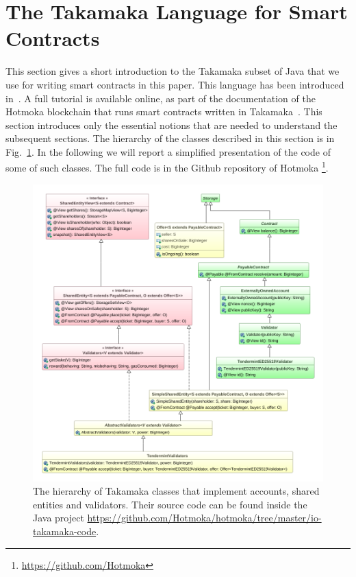 \section{The Takamaka Language for Smart Contracts}\label{sec:takamaka}

This section gives a short introduction to the Takamaka subset of
Java that we use for writing smart contracts in this paper.
This language has been introduced in~\cite{Spoto19}. A full tutorial
is available online, as part of the documentation of the Hotmoka
blockchain that runs smart contracts written
in Takamaka~\cite{hotmoka_repository}. This section introduces only
the essential notions that are needed to understand the subsequent sections.
The hierarchy of the classes described in this section is in Fig.~\ref{fig:hierarchy-entities}.
In the following we will report a simplified presentation of the code of some
of such classes. The full code is in the Github repository of Hotmoka \footnote{\url{https://github.com/Hotmoka}}.

\begin{figure}[t]
  \begin{center}
    \includegraphics[width=12.2cm]{entities-hierarchy.png}
  \end{center}
  \caption{The hierarchy of Takamaka classes that implement accounts, shared entities and validators. Their source code can be found inside the Java project \textsf{\url{https://github.com/Hotmoka/hotmoka/tree/master/io-takamaka-code}}.}\label{fig:hierarchy-entities}
\end{figure}

